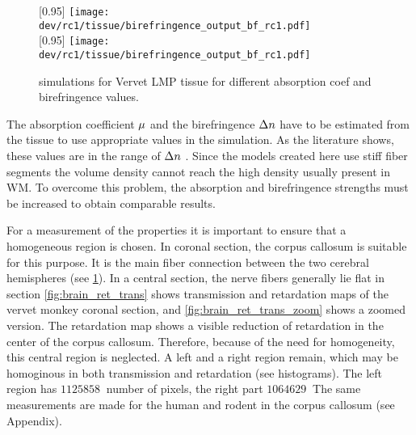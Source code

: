 %
%
%
\begin{figure}[!t]
\centering
[0.95\textwidth]{
\texttt{[image: dev/rc1/tissue/birefringence\_output\_bf\_rc1.pdf]}}\\[1em]
[0.95\textwidth]{
\texttt{[image: dev/rc1/tissue/birefringence\_output\_bf\_rc1.pdf]}}
\caption{simulations for Vervet LMP tissue for different absorption coef and birefringence values. }
\label{fig:parameterModelSim}
\end{figure}
%
The absorption coefficient $\textnormal{$\mu$}{}$ and the birefringence $\textnormal{$\Delta n$}{}$ have to be estimated from the tissue to use appropriate values in the simulation.
As the literature shows, these values are in the range of $\textnormal{$\Delta n$}{}$ \dummy{}.
Since the models created here use stiff fiber segments the volume density cannot reach the high density usually present in \ac{WM}.
To overcome this problem, the absorption and birefringence strengths must be increased to obtain comparable results.
\par
%
For a measurement of the properties it is important to ensure that a homogeneous region is chosen.
In coronal section, the corpus callosum is suitable for this purpose. It is the main fiber connection between the two cerebral hemispheres (see \cref{fig:parameterModelSim}). In a central section, the nerve fibers generally lie flat in section
%
\ref{fig:brain_ret_trans} shows transmission and retardation maps of the vervet monkey coronal section, and \ref{fig:brain_ret_trans_zoom} shows a zoomed version.
The retardation map shows a visible reduction of retardation in the center of the corpus callosum.
Therefore, because of the need for homogeneity, this central region is neglected.
A left and a right region remain, which may be homoginous in both transmission and retardation (see histograms).
The left region has $\SI{1125858}{}$ number of pixels, the right part $\SI{1064629}{}$
%
The same measurements are made for the human and rodent in the corpus callosum (see Appendix). 
%
%
%
